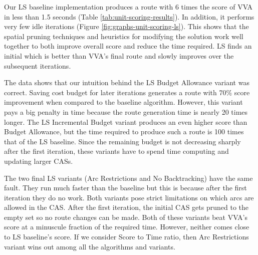 \documentclass[honors]{union-cs-thesis}
\begin{document}
Our LS baseline implementation produces a route with 6 times the score of VVA in less than 1.5 seconds (Table \ref{tab:unit-scoring-results}). In addition, it performs very few idle iterations (Figure \ref{fig:graphs-unit-scoring-ls}). This shows that the spatial pruning techniques and heuristics for modifying the solution work well together to both improve overall score and reduce the time required. LS finds an initial which is better than VVA's final route and slowly improves over the subsequent iterations.

The data shows that our intuition behind the LS Budget Allowance variant was correct. Saving cost budget for later iterations generates a route with 70\% score improvement when compared to the baseline algorithm. However, this variant pays a big penalty in time because the route generation time is nearly 20 times longer. The LS Incremental Budget variant produces an even higher score than Budget Allowance, but the time required to produce such a route is 100 times that of the LS baseline. Since the remaining budget is not decreasing sharply after the first iteration, these variants have to spend time computing and updating larger CASs.

The two final LS variants (Arc Restrictions and No Backtracking) have the same fault. They run much faster than the baseline but this is because after the first iteration they do no work. Both variants pose strict limitations on which arcs are allowed in the CAS. After the first iteration, the initial CAS gets pruned to the empty set so no route changes can be made. Both of these variants beat VVA's score at a minuscule fraction of the required time. However, neither comes close to LS baseline's score. If we consider Score to Time ratio, then Arc Restrictions variant wins out among all the algorithms and variants.
\end{document}
